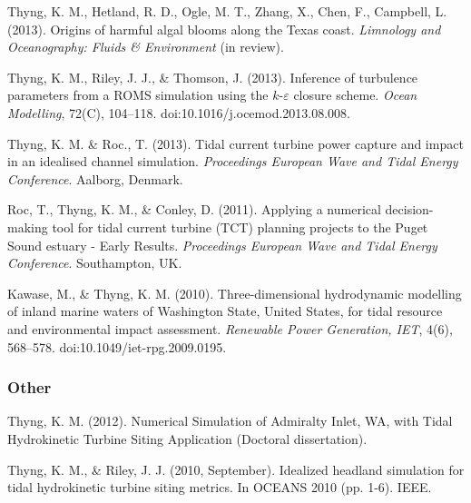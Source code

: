 \documentclass[10pt,letterpaper]{article}
\renewenvironment{itemize}{
  \begin{list}{}{
    \setlength{\leftmargin}{1.5em}
    \setlength{\itemsep}{0.25em}
    \setlength{\parskip}{0pt}
    \setlength{\parsep}{0.25em}
  }
}{
  \end{list}
}
\begin{document}
\begin{itemize}


\item Thyng, K. M., Hetland, R. D., Ogle, M. T., Zhang, X., Chen, F., Campbell, L. (2013). Origins of harmful algal blooms along the Texas coast. \textit{Limnology and Oceanography: Fluids \& Environment} (in review).

\item Thyng, K. M., Riley, J. J., \& Thomson, J. (2013). Inference of turbulence parameters from a ROMS simulation using the $k$-$\varepsilon$ closure scheme. \textit{Ocean Modelling}, 72(C), 104--118. doi:10.1016/j.ocemod.2013.08.008.

\item Thyng, K. M. \& Roc., T. (2013). Tidal current turbine power capture and impact in an idealised channel simulation. \textit{Proceedings European Wave and Tidal Energy Conference}. Aalborg, Denmark.

\item Roc, T., Thyng, K. M., \& Conley, D. (2011). Applying a numerical decision-making tool for tidal current turbine (TCT) planning projects to the Puget Sound estuary - Early Results. \textit{Proceedings European Wave and Tidal Energy Conference}. Southampton, UK.

\item Kawase, M., \& Thyng, K. M. (2010). Three-dimensional hydrodynamic modelling of inland marine waters of Washington State, United States, for tidal resource and environmental impact assessment. \textit{Renewable Power Generation, IET}, 4(6), 568--578. doi:10.1049/iet-rpg.2009.0195.

\end{itemize}

\subsubsection*{Other}

\begin{itemize}

\item Thyng, K. M. (2012). Numerical Simulation of Admiralty Inlet, WA, with Tidal Hydrokinetic Turbine Siting Application (Doctoral dissertation).

\item Thyng, K. M., \& Riley, J. J. (2010, September). Idealized headland simulation for tidal hydrokinetic turbine siting metrics. In OCEANS 2010 (pp. 1-6). IEEE.

\end{itemize}
\end{document}
